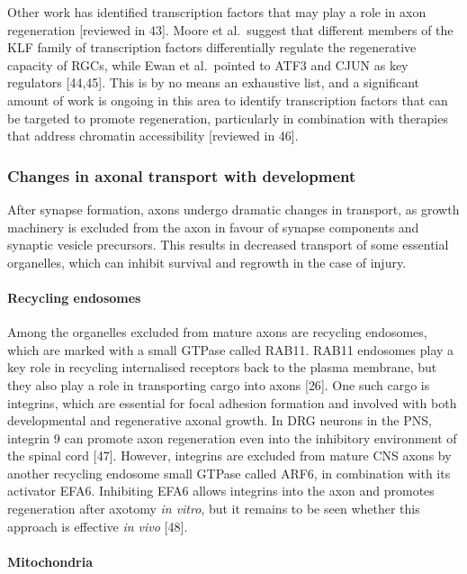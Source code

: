 \documentclass[
  12pt,
  a4paper,
]{book}
\begin{document}
Other work has identified transcription factors that may play a role in axon regeneration {[}reviewed in 43{]}. Moore et al.~suggest that different members of the KLF family of transcription factors differentially regulate the regenerative capacity of RGCs, while Ewan et al.~pointed to ATF3 and CJUN as key regulators {[}44,45{]}. This is by no means an exhaustive list, and a significant amount of work is ongoing in this area to identify transcription factors that can be targeted to promote regeneration, particularly in combination with therapies that address chromatin accessibility {[}reviewed in 46{]}.

\subsubsection{Changes in axonal transport with development}\label{changes-in-axonal-transport-with-development}

After synapse formation, axons undergo dramatic changes in transport, as growth machinery is excluded from the axon in favour of synapse components and synaptic vesicle precursors. This results in decreased transport of some essential organelles, which can inhibit survival and regrowth in the case of injury.

\paragraph{Recycling endosomes}\label{recycling-endosomes}

Among the organelles excluded from mature axons are recycling endosomes, which are marked with a small GTPase called RAB11. RAB11 endosomes play a key role in recycling internalised receptors back to the plasma membrane, but they also play a role in transporting cargo into axons {[}26{]}. One such cargo is integrins, which are essential for focal adhesion formation and involved with both developmental and regenerative axonal growth. In DRG neurons in the PNS, integrin \textalpha{}9 can promote axon regeneration even into the inhibitory environment of the spinal cord {[}47{]}. However, integrins are excluded from mature CNS axons by another recycling endosome small GTPase called ARF6, in combination with its activator EFA6. Inhibiting EFA6 allows integrins into the axon and promotes regeneration after axotomy \emph{in vitro}, but it remains to be seen whether this approach is effective \emph{in vivo} {[}48{]}.

\paragraph{Mitochondria}\label{mitochondria}
\end{document}
